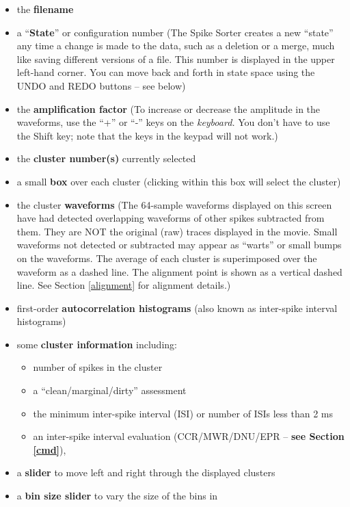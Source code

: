 \documentclass[12pt]{article}
\begin{document}
\begin{itemize}
\item the \textbf{filename}
\item a ``\textbf{State}{}'' or configuration number (The Spike Sorter
  creates a new ``state'' any time a change is made to the data, such
  as a deletion or a merge, much like saving different versions of a
  file. This number is displayed in the upper left-hand corner. You
  can move back and forth in state space using the {\sf UNDO} and {\sf
    REDO} buttons -- see below)
\item the \textbf{amplification factor }(To increase or decrease the
  amplitude in the waveforms, use the ``+'' or ``-'' keys on the
  \textit{keyboard. }You don't have to use the Shift key; note that
  the keys in the keypad will not work.)
\item the \textbf{cluster number(s)} currently selected
\item a small \textbf{box} over each cluster (clicking within this box
  will select the cluster)
\item the cluster \textbf{waveforms} (The 64-sample waveforms
  displayed on this screen have had detected overlapping waveforms of
  other spikes subtracted from them. They are NOT the original (raw)
  traces displayed in the movie. Small waveforms not detected or
  subtracted may appear as ``warts'' or small bumps on the
  waveforms. The average of each cluster is superimposed over the
  waveform as a dashed line. The alignment point is shown as a
  vertical dashed line. See Section \ref{alignment} for alignment
  details.)
\item first-order \textbf{autocorrelation histograms} (also
  known as inter-spike interval histograms)
\item some \textbf{cluster information} including:
\begin{itemize}
\item number of spikes in the cluster
\item a ``clean/marginal/dirty{}'' assessment
\item the minimum inter-spike interval (ISI) or number of ISIs less
  than 2 ms
\item an inter-spike interval evaluation (CCR/MWR/DNU/EPR -- 
  \textbf{see Section \ref{cmd}}),
\end{itemize}
\item a \textbf{slider} to move left and right through the displayed
  clusters
\item a \textbf{bin size slider} to vary the size of the bins in

\end{itemize}
\end{document}
